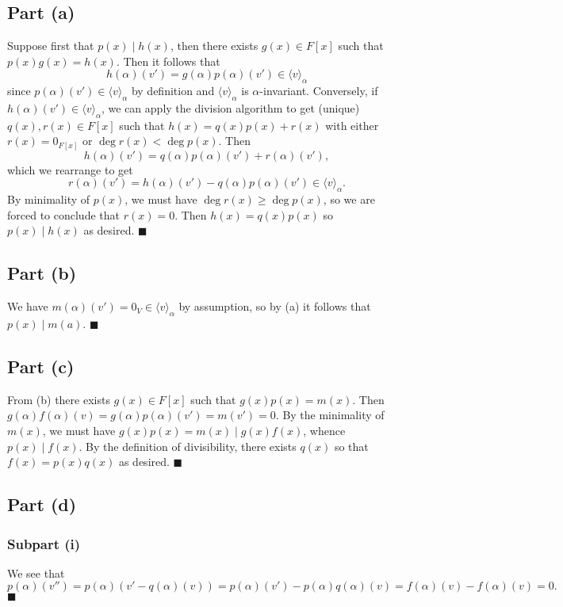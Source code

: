 \documentclass[12pt]{article}
\begin{document}
\subsection*{Part (a)}
Suppose first that $p(x) \mid h(x)$, then there exists $g(x)\in F[x]$ such that
$p(x)g(x)=h(x)$. Then it follows that
\[
    h(\alpha)(v')=g(\alpha)p(\alpha)(v')\in \langle v \rangle_\alpha
\]
since $p(\alpha)(v')\in\langle v \rangle_\alpha$ by definition and
$\langle v \rangle_\alpha$ is $\alpha$-invariant. Conversely, if
$h(\alpha)(v')\in\langle v \rangle_\alpha$, we can apply the division algorithm
to get (unique) $q(x),r(x)\in F[x]$ such that $h(x)=q(x)p(x)+r(x)$ with either
$r(x)=0_{F[x]}$ or $\deg r(x)<\deg p(x)$.
Then
\[
    h(\alpha)(v')=q(\alpha)p(\alpha)(v')+r(\alpha)(v'),
\]
which we rearrange to get
\[
    r(\alpha)(v') = h(\alpha)(v') - q(\alpha)p(\alpha)(v')
    \in \langle v \rangle_\alpha.
\]
By minimality of $p(x)$, we must have $\deg r(x) \geq \deg p(x)$, so
we are forced to conclude that $r(x)=0$. Then $h(x)=q(x)p(x)$ so
$p(x) \mid h(x)$ as desired.
\hfill$\blacksquare$

\subsection*{Part (b)}
We have $m(\alpha)(v')=0_V\in \langle v \rangle_\alpha$ by
assumption, so by (a) it follows that $p(x) \mid m(a)$.
\hfill$\blacksquare$

\subsection*{Part (c)}
From (b) there exists $g(x)\in F[x]$ such that $g(x)p(x)=m(x)$.
Then $g(\alpha)f(\alpha)(v)=g(\alpha)p(\alpha)(v')=m(v')=0$.
By the minimality of $m(x)$, we must have $g(x)p(x)=m(x) \mid g(x)f(x)$,
whence $p(x) \mid f(x)$. By the definition of divisibility, there exists $q(x)$
so that $f(x)=p(x)q(x)$ as desired.
\hfill$\blacksquare$

\subsection*{Part (d)}
\subsubsection*{Subpart (i)}
We see that 
\[p(\alpha)(v'')=p(\alpha)(v'-q(\alpha)(v))
=p(\alpha)(v')-p(\alpha)q(\alpha)(v)=f(\alpha)(v)-f(\alpha)(v)=0.\]
\hfill$\blacksquare$
\end{document}

